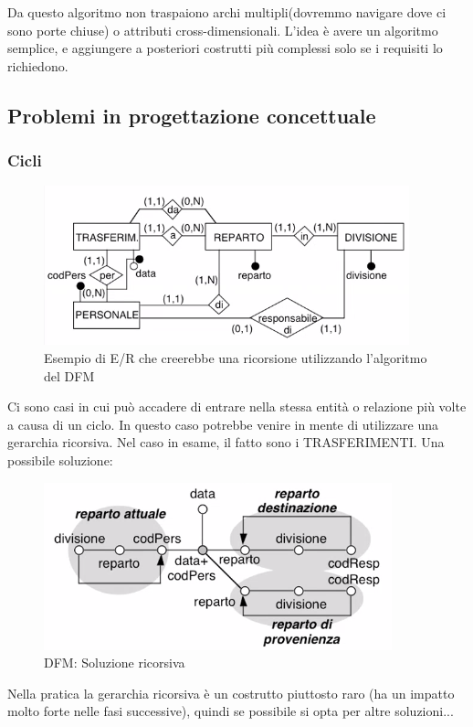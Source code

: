 \begin{warn}
	Da questo algoritmo non traspaiono archi multipli(dovremmo navigare dove ci sono porte chiuse) o attributi cross-dimensionali. L'idea è avere un algoritmo semplice, e aggiungere a posteriori costrutti più complessi solo se i requisiti lo richiedono.
\end{warn}
\subsection{Problemi in progettazione concettuale}
\subsubsection{Cicli}
\begin{figure}[H]
	\begin{center}
		\includegraphics[width=0.5\linewidth]{img/errecur.PNG}
		\caption{Esempio di E/R che creerebbe una ricorsione utilizzando l'algoritmo del DFM}
	\end{center}
\end{figure}
\noindent Ci sono casi in cui può accadere di entrare nella stessa entità o relazione più volte a causa di un ciclo. In questo caso potrebbe venire in mente di utilizzare una gerarchia ricorsiva.
Nel caso in esame, il fatto sono i TRASFERIMENTI. Una possibile soluzione:
\begin{figure}[H]
	\begin{center}
		\includegraphics[width=0.5\linewidth]{img/dfmrecurs.PNG}
		\caption{DFM: Soluzione ricorsiva}
	\end{center}
\end{figure}
\noindent Nella pratica la gerarchia ricorsiva è un costrutto piuttosto raro (ha un impatto molto forte nelle fasi successive), quindi se possibile si opta per altre soluzioni...\newline
